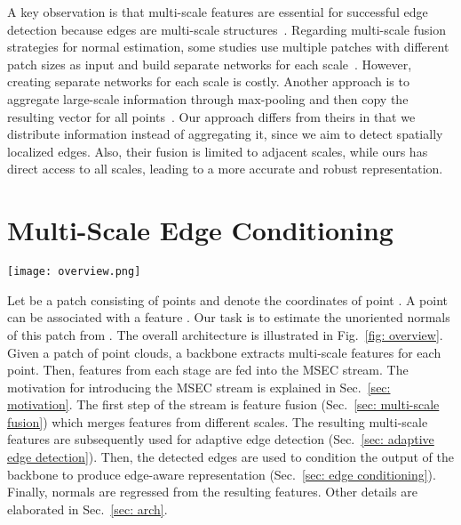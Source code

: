 \documentclass[sigconf]{acmart}
\begin{document}
A key observation is that multi-scale features are essential for successful edge detection because edges are multi-scale structures~\cite{marr1980theory}. Regarding multi-scale fusion strategies for normal estimation, some studies use multiple patches with different patch sizes as input and build separate networks for each scale~\cite{guerrero2018pcpnet,ben2019nesti}. However, creating separate networks for each scale is costly. Another approach is to aggregate large-scale information through max-pooling and then copy the resulting vector for all points~\cite{zhu2021adafit,li2022graphfit,li2022hsurf}. Our approach differs from theirs in that we distribute information instead of aggregating it, since we aim to detect spatially localized edges. Also, their fusion is limited to adjacent scales, while ours has direct access to all scales, leading to a more accurate and robust representation.








\section{Multi-Scale Edge Conditioning}\label{sec: method}

\begin{figure*}[tbhp]
    \centering
    \texttt{[image: overview.png]}
    \caption{The architecture of MSECNet. The MSEC stream consists of multi-scale fusion, edge detection, and edge conditioning steps. LBR stands for a sequential application of a Linear transformation, a batch normalization, and a ReLU. }
    \label{fig: overview}
    \Description{}
\end{figure*}

Let  be a patch consisting of  points and  denote the coordinates of point . A point  can be associated with a feature . Our task is to estimate the unoriented normals  of this patch from . 
The overall architecture is illustrated in Fig.~\ref{fig: overview}. 
Given a patch of point clouds, a backbone extracts multi-scale features for each point. 
Then, features from each stage are fed into the MSEC stream. The motivation for introducing the MSEC stream is explained in Sec.~\ref{sec: motivation}.
The first step of the stream is feature fusion (Sec.~\ref{sec: multi-scale fusion}) which merges features from different scales. The resulting multi-scale features are subsequently used for adaptive edge detection (Sec.~\ref{sec: adaptive edge detection}). Then, the detected edges are used to condition the output of the backbone to produce edge-aware representation (Sec.~\ref{sec: edge conditioning}).  
Finally, normals are regressed from the resulting features. Other details are elaborated in Sec.~\ref{sec: arch}.
\end{document}
